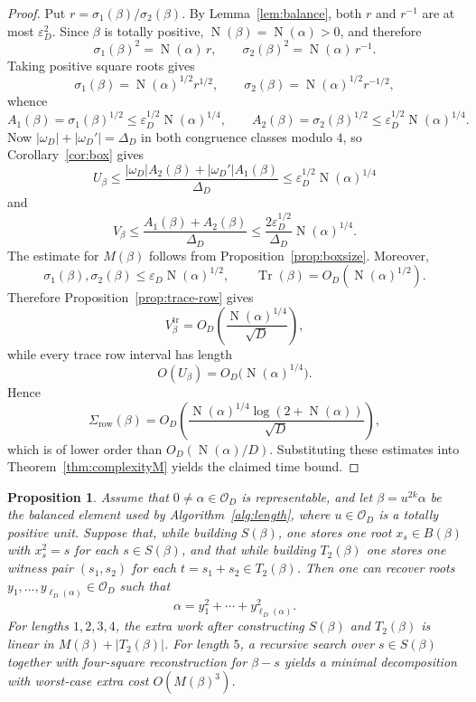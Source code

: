 \documentclass[manuscript,screen]{acmart}
\renewcommand{\le}{\leqslant}
\theoremstyle{plain}
\newtheorem{proposition}[theorem]{Proposition}
\theoremstyle{definition}
\theoremstyle{nonitalicremark}
\newcommand{\OD}{\mathcal{O}_D}
\newcommand{\len}{\ell}
\newcommand{\wD}{\omega_D}
\newcommand{\wDp}{\omega_D'}
\newcommand{\sig}{\sigma}
\newcommand{\epsD}{\varepsilon_D}
\newcommand{\Tr}{\operatorname{Tr}}
\newcommand{\Norm}{\operatorname{N}}
\begin{document}
\begin{proof}
Put $r=\sig_1(\beta)/\sig_2(\beta)$. By Lemma~\ref{lem:balance}, both $r$ and $r^{-1}$ are at
most $\epsD^2$. Since $\beta$ is totally positive, $\Norm(\beta)=\Norm(\alpha)>0$, and therefore
\[
\sig_1(\beta)^2 = \Norm(\alpha)\, r,
\qquad
\sig_2(\beta)^2 = \Norm(\alpha)\, r^{-1}.
\]
Taking positive square roots gives
\[
\sig_1(\beta) = \Norm(\alpha)^{1/2} r^{1/2},
\qquad
\sig_2(\beta) = \Norm(\alpha)^{1/2} r^{-1/2},
\]
whence
\[
A_1(\beta)=\sig_1(\beta)^{1/2} \le \epsD^{1/2}\Norm(\alpha)^{1/4},
\qquad
A_2(\beta)=\sig_2(\beta)^{1/2} \le \epsD^{1/2}\Norm(\alpha)^{1/4}.
\]
Now
$|\wD|+|\wDp|=\Delta_D$ in both congruence classes modulo $4$, so
Corollary~\ref{cor:box} gives
\[
U_\beta \le \frac{|\wD|A_2(\beta)+|\wDp|A_1(\beta)}{\Delta_D}
\le \epsD^{1/2}\Norm(\alpha)^{1/4}
\]
and
\[
V_\beta \le \frac{A_1(\beta)+A_2(\beta)}{\Delta_D}
\le \frac{2\epsD^{1/2}}{\Delta_D}\Norm(\alpha)^{1/4}.
\]
The estimate for $M(\beta)$ follows from Proposition~\ref{prop:boxsize}.
Moreover,
\[
\sig_1(\beta),\sig_2(\beta)\le \epsD\Norm(\alpha)^{1/2},
\qquad
\Tr(\beta)=O_D(\Norm(\alpha)^{1/2}).
\]
Therefore Proposition~\ref{prop:trace-row} gives
\[
V_\beta^{\mathrm{tr}}=O_D\!\left(\frac{\Norm(\alpha)^{1/4}}{\sqrt D}\right),
\]
while every trace row interval has length
\[
O(U_\beta)=O_D\!\bigl(\Norm(\alpha)^{1/4}\bigr).
\]
Hence
\[
\Sigma_{\mathrm{row}}(\beta)=O_D\!\left(\frac{\Norm(\alpha)^{1/4}\log(2+\Norm(\alpha))}{\sqrt D}\right),
\]
which is of lower order than $O_D(\Norm(\alpha)/D)$. Substituting these estimates into
Theorem~\ref{thm:complexityM} yields the claimed time bound.
\end{proof}

\begin{proposition}\label{prop:constructive}
Assume that $0\neq\alpha\in\OD$ is representable, and let $\beta=u^{2k}\alpha$ be the balanced
element used by Algorithm~\ref{alg:length}, where $u\in\OD$ is a totally positive unit.
Suppose that, while building $S(\beta)$, one stores one root $x_s\in B(\beta)$ with
$x_s^2=s$ for each $s\in S(\beta)$, and that while building $T_2(\beta)$ one stores one witness
pair $(s_1,s_2)$ for each $t=s_1+s_2\in T_2(\beta)$. Then one can recover roots
$y_1,\dots,y_{\len_D(\alpha)}\in\OD$ such that
\[
\alpha = y_1^2+\cdots+y_{\len_D(\alpha)}^2.
\]
For lengths $1,2,3,4$, the extra work after constructing $S(\beta)$ and $T_2(\beta)$ is linear in
$M(\beta)+|T_2(\beta)|$. For length $5$, a recursive search over $s\in S(\beta)$ together with
four-square reconstruction for $\beta-s$ yields a minimal decomposition with worst-case extra cost
$O(M(\beta)^3)$.
\end{proposition}
\end{document}

